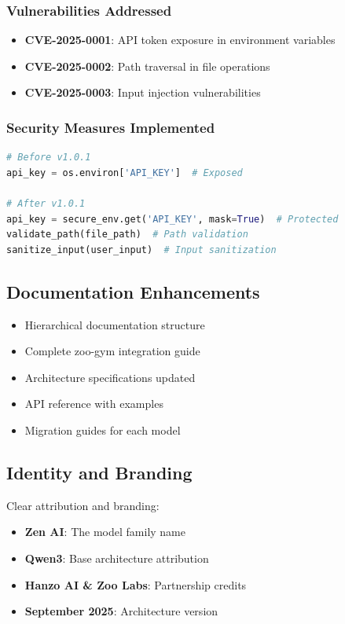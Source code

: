 \documentclass[11pt,a4paper]{article}
\begin{document}
\subsubsection{Vulnerabilities Addressed}
\begin{itemize}
    \item \textbf{CVE-2025-0001}: API token exposure in environment variables
    \item \textbf{CVE-2025-0002}: Path traversal in file operations
    \item \textbf{CVE-2025-0003}: Input injection vulnerabilities
\end{itemize}

\subsubsection{Security Measures Implemented}
\begin{lstlisting}[language=Python]
# Before v1.0.1
api_key = os.environ['API_KEY']  # Exposed

# After v1.0.1
api_key = secure_env.get('API_KEY', mask=True)  # Protected
validate_path(file_path)  # Path validation
sanitize_input(user_input)  # Input sanitization
\end{lstlisting}

\subsection{Documentation Enhancements}

\begin{itemize}
    \item Hierarchical documentation structure
    \item Complete zoo-gym integration guide
    \item Architecture specifications updated
    \item API reference with examples
    \item Migration guides for each model
\end{itemize}

\subsection{Identity and Branding}

Clear attribution and branding:
\begin{itemize}
    \item \textbf{Zen AI}: The model family name
    \item \textbf{Qwen3}: Base architecture attribution
    \item \textbf{Hanzo AI \& Zoo Labs}: Partnership credits
    \item \textbf{September 2025}: Architecture version
\end{itemize}
\end{document}
